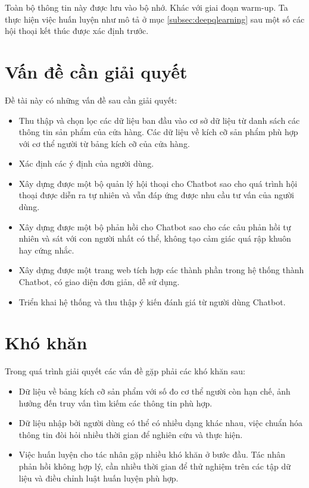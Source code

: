Toàn bộ thông tin này được lưu vào bộ nhớ. Khác với giai đoạn warm-up.
Ta thực hiện việc huấn luyện như mô tả ở mục \ref{subsec:deepqlearning}
sau một số các hội thoại kết thúc được xác định trước.

\section{Vấn đề cần giải quyết}
Đề tài này có những vấn đề sau cần giải quyết:

\begin{itemize}
    \item Thu thập và chọn lọc các dữ liệu ban đầu vào cơ sở dữ liệu
    từ danh sách các thông tin sản phẩm của cửa hàng. Các dữ liệu về
    kích cỡ sản phẩm phù hợp với cơ thể người từ bảng kích cỡ của cửa hàng.
    \item Xác định các ý định của người dùng.
    \item Xây dựng được một bộ quản lý hội thoại cho Chatbot sao cho
    quá trình hội thoại được diễn ra tự nhiên và vẫn đáp ứng được
    nhu cầu tư vấn của người dùng.
    \item Xây dựng được một bộ phản hồi cho Chatbot sao cho các câu
    phản hồi tự nhiên và sát với con người nhất có thể, không tạo
    cảm giác quá rập khuôn hay cứng nhắc.
    \item Xây dựng được một trang web tích hợp các thành phần trong
    hệ thống thành Chatbot, có giao diện đơn giản, dễ sử dụng.
    \item Triển khai hệ thống và thu thập ý kiến đánh giá từ
    người dùng Chatbot.
\end{itemize}

\section{Khó khăn}
Trong quá trình giải quyết các vấn đề gặp phải các khó khăn sau:

\begin{itemize}
    \item Dữ liệu về bảng kích cỡ sản phẩm với số đo cơ thể người còn
    hạn chế, ảnh hưởng đến truy vấn tìm kiếm các thông tin phù hợp.
    \item Dữ liệu nhập bởi người dùng có thể có nhiều dạng khác nhau,
    việc chuẩn hóa thông tin đòi hỏi nhiều thời gian để nghiên cứu
    và thực hiện.
    \item Việc huấn luyện cho tác nhân gặp nhiều khó khăn ở bước đầu.
    Tác nhân phản hồi không hợp lý, cần nhiều thời gian để thử nghiệm
    trên các tập dữ liệu và điều chỉnh luật huấn luyện phù hợp.
\end{itemize}

